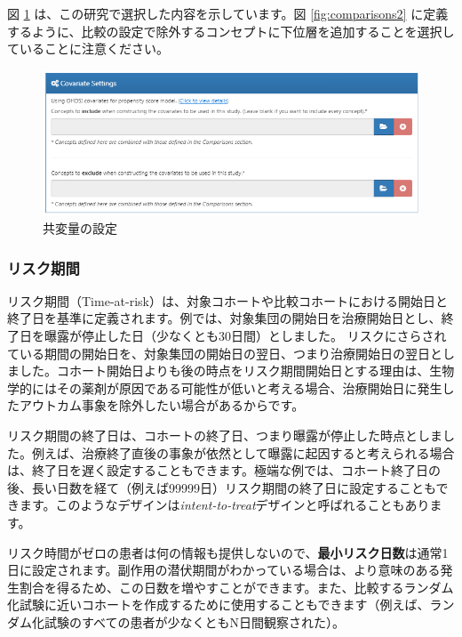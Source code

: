 \documentclass[
  11pt]{book}
\theoremstyle{definition}
\theoremstyle{definition}
\theoremstyle{definition}
\theoremstyle{definition}
\theoremstyle{remark}
\begin{document}
図 \ref{fig:covariateSettings} は、この研究で選択した内容を示しています。図 \ref{fig:comparisons2} に定義するように、比較の設定で除外するコンセプトに下位層を追加することを選択していることに注意ください。

\begin{figure}

{\centering \includegraphics[width=1\linewidth]{images/PopulationLevelEstimation/covariateSettings} 

}

\caption{共変量の設定}\label{fig:covariateSettings}
\end{figure}

\subsubsection*{リスク期間}\label{ux30eaux30b9ux30afux671fux9593-2}

リスク期間（Time-at-risk）は、対象コホートや比較コホートにおける開始日と終了日を基準に定義されます。例では、対象集団の開始日を治療開始日とし、終了日を曝露が停止した日（少なくとも30日間）としました。 リスクにさらされている期間の開始日を、対象集団の開始日の翌日、つまり治療開始日の翌日としました。コホート開始日よりも後の時点をリスク期間開始日とする理由は、生物学的にはその薬剤が原因である可能性が低いと考える場合、治療開始日に発生したアウトカム事象を除外したい場合があるからです。

リスク期間の終了日は、コホートの終了日、つまり曝露が停止した時点としました。例えば、治療終了直後の事象が依然として曝露に起因すると考えられる場合は、終了日を遅く設定することもできます。極端な例では、コホート終了日の後、長い日数を経て（例えば99999日）リスク期間の終了日に設定することもできます。このようなデザインは\emph{intent-to-treat}デザインと呼ばれることもあります。

リスク時間がゼロの患者は何の情報も提供しないので、\textbf{最小リスク日数}は通常1日に設定されます。副作用の潜伏期間がわかっている場合は、より意味のある発生割合を得るため、この日数を増やすことができます。また、比較するランダム化試験に近いコホートを作成するために使用することもできます（例えば、ランダム化試験のすべての患者が少なくともN日間観察された）。
\end{document}
